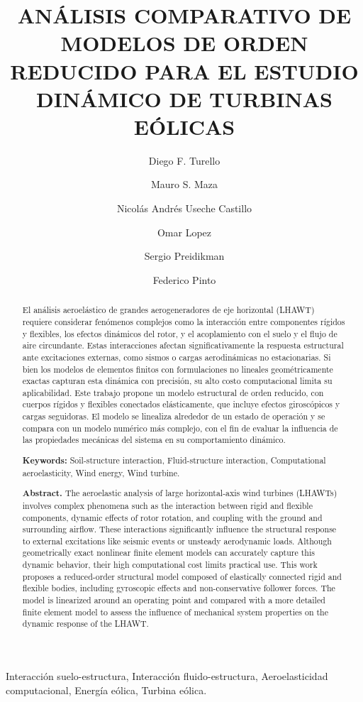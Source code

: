 \documentclass[oneside,a4paper,spanish,links,pagenumbers]{amca}
\title{ANÁLISIS COMPARATIVO DE MODELOS DE ORDEN REDUCIDO PARA EL ESTUDIO DINÁMICO DE TURBINAS EÓLICAS}
\author[a,b,c]{Diego F. Turello}
\author[a]{Mauro S. Maza}
\author[d]{Nicolás Andrés Useche Castillo}
\author[d]{Omar Lopez}
\author[a,b]{Sergio Preidikman}
\author[a,b]{Federico Pinto}
\affil[a]{Depto. Estructuras FCEFyN UNC, 5000 Córdoba, Argentina}
\affil[b]{IDIT--UNC-CONICET, Av. Vélez Sarsfield 1611, Córdoba, Argentina}
\affil[c]{GIMNI--UTN-FRSF, Lavaisse 610, 3000 Santa Fe, Argentina}
\affil[d]{Departamento de Ingeniería Mecánica, Universidad de los Andes, Bogotá, Colombia}
\begin{document}
\maketitle
\begin{keywords}
Interacción suelo-estructura, Interacción fluido-estructura, Aeroelasticidad
computacional, Energía eólica, Turbina eólica.
\end{keywords}
\par
\begin{abstract}
El análisis aeroelástico de grandes aerogeneradores de eje horizontal (LHAWT) requiere considerar
fenómenos complejos como la interacción entre componentes rígidos y flexibles, los efectos dinámicos
del rotor, y el acoplamiento con el suelo y el flujo de aire circundante. Estas interacciones afectan significativamente la respuesta estructural ante excitaciones externas, como sismos o cargas aerodinámicas no
estacionarias. Si bien los modelos de elementos finitos con formulaciones no lineales geométricamente
exactas capturan esta dinámica con precisión, su alto costo computacional limita su aplicabilidad. Este
trabajo propone un modelo estructural de orden reducido, con cuerpos rígidos y flexibles conectados
elásticamente, que incluye efectos giroscópicos y cargas seguidoras. El modelo se linealiza alrededor de
un estado de operación y se compara con un modelo numérico más complejo, con el fin de evaluar la
influencia de las propiedades mecánicas del sistema en su comportamiento dinámico.
\par\medskip
\noindent\textbf{Keywords:} Soil-structure interaction, Fluid-structure interaction, Computational aeroelasticity, Wind
energy, Wind turbine.
\par\smallskip
\noindent\textbf{Abstract.} The aeroelastic analysis of large horizontal-axis wind turbines (LHAWTs) involves complex
phenomena such as the interaction between rigid and flexible components, dynamic effects of rotor rotation, and coupling with the ground and surrounding airflow. These interactions significantly influence the structural response to external excitations like seismic events or unsteady aerodynamic loads.
Although geometrically exact nonlinear finite element models can accurately capture this dynamic behavior, their high computational cost limits practical use. This work proposes a reduced-order structural
model composed of elastically connected rigid and flexible bodies, including gyroscopic effects and
non-conservative follower forces. The model is linearized around an operating point and compared with
a more detailed finite element model to assess the influence of mechanical system properties on the
dynamic response of the LHAWT.
\end{abstract}
\end{document}
